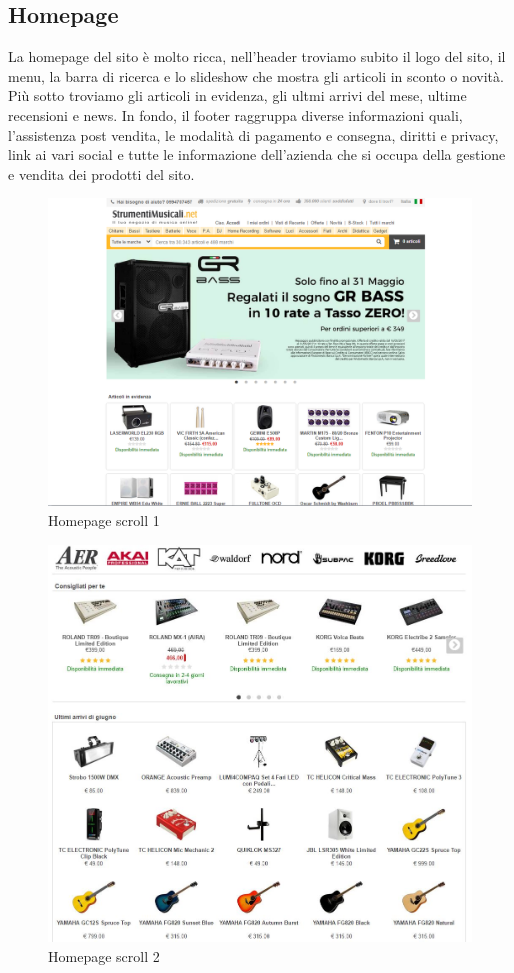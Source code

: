 \documentclass[12pt]{article}
\begin{document}
		\subsection{Homepage}
	La homepage del sito è molto ricca, nell'header troviamo subito il logo del sito, il menu, la barra di ricerca e lo slideshow che mostra gli articoli in sconto o novità. Più sotto troviamo gli articoli in evidenza, gli ultmi arrivi del mese, ultime recensioni e news. In fondo, il footer raggruppa diverse informazioni quali, l'assistenza post vendita, le modalità di pagamento e consegna, diritti e privacy, link ai vari social e tutte le informazione dell'azienda che si occupa della gestione e vendita dei prodotti del sito.
	\vspace{1cm}
	\begin{figure}[ht!]
		\centering	
		\includegraphics[width=150mm]{images/home.png}
		\caption{Homepage scroll 1}
	\end{figure}
	\begin{figure}
		\centering	
		\includegraphics[width=150mm]{images/home2.png}%
		\caption{Homepage scroll 2}
	\end{figure}
\end{document}
